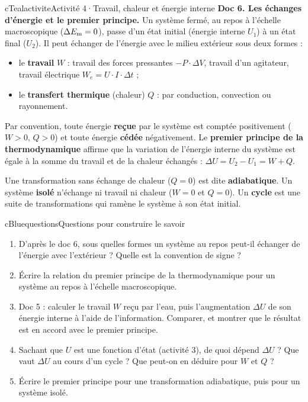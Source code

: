 \begin{rub}{cTeal}{activite}{Activité 4\enspace·\enspace Travail, chaleur et énergie interne}
\textbf{Doc 6. Les échanges d’énergie et le premier principe.} Un système fermé, au repos à l’échelle macroscopique ($\Delta E_{\mathrm{m}} = 0$), passe d’un état initial (énergie interne $U_1$) à un état final ($U_2$). Il peut échanger de l’énergie avec le milieu extérieur sous deux formes :
\begin{itemize}
  \item le \textbf{travail} $W$ : travail des forces pressantes $-P\cdot\Delta V$, travail d’un agitateur, travail électrique $W_e = U\cdot I\cdot\Delta t$ ;
  \item le \textbf{transfert thermique} (chaleur) $Q$ : par conduction, convection ou rayonnement.
\end{itemize}
Par convention, toute énergie \textbf{reçue} par le système est comptée positivement ($W > 0$, $Q > 0$) et toute énergie \textbf{cédée} négativement. Le \textbf{premier principe de la thermodynamique} affirme que la variation de l’énergie interne du système est égale à la somme du travail et de la chaleur échangés : $\Delta U = U_2 - U_1 = W + Q$.\par\smallskip
Une transformation sans échange de chaleur ($Q = 0$) est dite \textbf{adiabatique}. Un système \textbf{isolé} n’échange ni travail ni chaleur ($W = 0$ et $Q = 0$). Un \textbf{cycle} est une suite de transformations qui ramène le système à son état initial.
\end{rub}

\begin{rub}{cBlue}{questions}{Questions pour construire le savoir}
\begin{enumerate}
  \item {} D’après le doc 6, sous quelles formes un système au repos peut-il échanger de l’énergie avec l’extérieur ? Quelle est la convention de signe ?
  \item {} Écrire la relation du premier principe de la thermodynamique pour un système au repos à l’échelle macroscopique.
  \item {} Doc 5 : calculer le travail $W$ reçu par l’eau, puis l’augmentation $\Delta U$ de son énergie interne à l’aide de l’information. Comparer, et montrer que le résultat est en accord avec le premier principe.
  \item {} Sachant que $U$ est une fonction d’état (activité 3), de quoi dépend $\Delta U$ ? Que vaut $\Delta U$ au cours d’un cycle ? Que peut-on en déduire pour $W$ et $Q$ ?
  \item {} Écrire le premier principe pour une transformation adiabatique, puis pour un système isolé.
\end{enumerate}
\end{rub}

